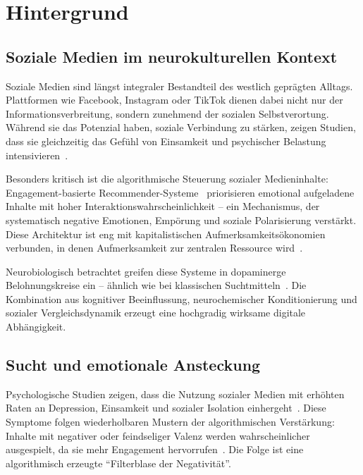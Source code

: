 
\section{Hintergrund}\label{sec:hintergrund}
\subsection{Soziale Medien im neurokulturellen Kontext}\label{subsec:soziale-medien-im-neurokulturellen-kontext}

Soziale Medien sind längst integraler Bestandteil des westlich geprägten Alltags.
Plattformen wie Facebook, Instagram oder TikTok dienen dabei nicht nur der Informationsverbreitung, sondern zunehmend der
sozialen Selbstverortung.
Während sie das Potenzial haben, soziale Verbindung zu stärken, zeigen Studien, dass sie gleichzeitig das Gefühl von
Einsamkeit und psychischer Belastung intensivieren~\cite{siddiq_social_2024,santini_social_2024}.

Besonders kritisch ist die algorithmische Steuerung sozialer Medieninhalte: Engagement-basierte Recommender-Systeme~\cite{milli_engagement_2024}
priorisieren emotional aufgeladene Inhalte mit hoher Interaktionswahrscheinlichkeit – ein Mechanismus, der systematisch
negative Emotionen, Empörung und soziale Polarisierung verstärkt.
Diese Architektur ist eng mit kapitalistischen Aufmerksamkeitsökonomien verbunden, in denen Aufmerksamkeit zur zentralen
Ressource wird~\cite{rey_alienation_2012}.

Neurobiologisch betrachtet greifen diese Systeme in dopaminerge Belohnungskreise ein – ähnlich wie bei klassischen
Suchtmitteln~\cite{de_social_nodate}.
Die Kombination aus kognitiver Beeinflussung, neurochemischer Konditionierung und sozialer Vergleichsdynamik erzeugt
eine hochgradig wirksame digitale Abhängigkeit.

\subsection{Sucht und emotionale Ansteckung}\label{subsec:sucht-und-emotionale-ansteckung}

Psychologische Studien zeigen, dass die Nutzung sozialer Medien mit erhöhten Raten an Depression, Einsamkeit und sozialer 
Isolation einhergeht~\cite{santini_social_2024}.
Diese Symptome folgen wiederholbaren Mustern der algorithmischen Verstärkung: Inhalte mit negativer oder feindseliger
Valenz werden wahrscheinlicher ausgespielt, da sie mehr Engagement hervorrufen~\cite{milli_engagement_2024}.
Die Folge ist eine algorithmisch erzeugte \enquote{Filterblase der Negativität}.

